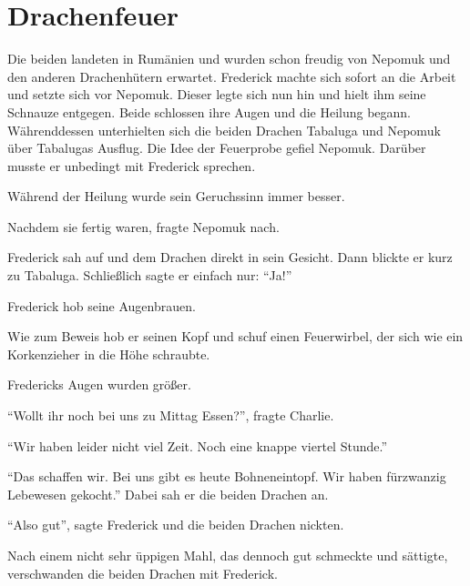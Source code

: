 \chapter{Drachenfeuer}


Die beiden landeten in Rumänien und wurden schon freudig von Nepomuk und den anderen Drachenhütern erwartet. Frederick machte sich sofort an die Arbeit und setzte sich vor Nepomuk. Dieser legte sich nun hin und hielt ihm seine Schnauze entgegen. Beide schlossen ihre Augen und die Heilung begann. Währenddessen unterhielten sich die beiden Drachen Tabaluga und Nepomuk über Tabalugas Ausflug. Die Idee der Feuerprobe gefiel Nepomuk. Darüber musste er unbedingt mit Frederick sprechen.

Während der Heilung wurde sein Geruchssinn immer besser.

Nachdem sie fertig waren, fragte Nepomuk nach. 

Frederick sah auf und dem Drachen direkt in sein Gesicht. Dann blickte er kurz zu Tabaluga. Schließlich sagte er einfach nur: \enquote{Ja!}


Frederick hob seine Augenbrauen. 

 Wie zum Beweis hob er seinen Kopf und schuf einen Feuerwirbel, der sich wie ein Korkenzieher in die Höhe schraubte.

Fredericks Augen wurden größer. 

\enquote{Wollt ihr noch bei uns zu Mittag Essen?}, fragte Charlie.

\enquote{Wir haben leider nicht viel Zeit. Noch eine knappe viertel Stunde.}

\enquote{Das schaffen wir. Bei uns gibt es heute Bohneneintopf. Wir haben für\abs zwanzig Lebewesen gekocht.} Dabei sah er die beiden Drachen an.

\enquote{Also gut}, sagte Frederick und die beiden Drachen nickten.

Nach einem nicht sehr üppigen Mahl, das dennoch gut schmeckte und sättigte, verschwanden die beiden Drachen mit Frederick.

